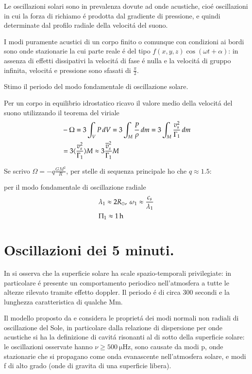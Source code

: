 \documentclass[oneside,12pt]{memoir}
\begin{document}
Le oscillazioni solari sono in prevalenza dovute ad onde acustiche, cio\'e oscillazioni in cui la forza di richiamo \'e prodotta dal gradiente di pressione, e quindi determinate dal profilo radiale della velocit\'a del suono.

I modi puramente acustici di un corpo finito o comunque con condizioni ai bordi sono onde stazionarie la cui parte reale \'e del tipo $f(x,y,z)\cos{(\omega t+\alpha)}$: in assenza di effetti dissipativi la velocit\'a di fase \'e nulla e la velocit\'a di gruppo infinita, velocit\'a e pressione sono sfasati di $\frac{\pi}{2}$.

Stimo il periodo del modo fondamentale di oscillazione solare.

Per un corpo in equilibrio idrostatico ricavo il valore medio della velocit\'a del suono utilizzando il teorema del viriale
\begin{align*}
    &-\Omega=3\int_VP\,dV=3\int_M\frac{P}{\rho}\,dm=3\int_M\frac{v_s^2}{\Gamma_1}\,dm\\
    &=3\langle \frac{v_s^2}{\Gamma_1} \rangle M\approx3\frac{\overline{v}_s^2}{\Gamma_1}M
\end{align*}

Se scrivo $\Omega=-q\frac{GM^2}{R}$, per stelle di sequenza principale ho che $q\approx1.5$:

per il modo fondamentale di oscillazione radiale
\begin{align*}
    &\lambda_1\approx 2\rsun{},\ \omega_1\approx\frac{c_s}{\lambda_1}\\
    &\Pi_1\approx\SI{1}{\hour}
\end{align*}


\section{Oscillazioni dei 5 minuti.}

In \citet{lei62velocity} si osserva che la superficie solare ha scale spazio-temporali privilegiate: in particolare \'e presente un comportamento periodico nell'atmosfera a tutte le altezze rilevato tramite effetto doppler. Il periodo \'e di circa 300 secondi e la lunghezza caratteristica di qualche \si{\mega\meter}.

Il modello proposto da \citet{ulrich70five} e \citet*{stein71five} considera le propriet\'a dei modi normali non radiali di oscillazione del Sole, in particolare dalla relazione di dispersione per onde acustiche si ha la definizione di cavit\'a risonanti al di sotto della superficie solare: le oscillazioni osservate hanno $\nu\geq\SI{500}{\micro\hertz}$, sono causate da modi p, onde stazionarie che si propagano come onda evanascente nell'atmosfera solare, e modi f di alto grado (onde di gravita di una superficie libera).
\end{document}
